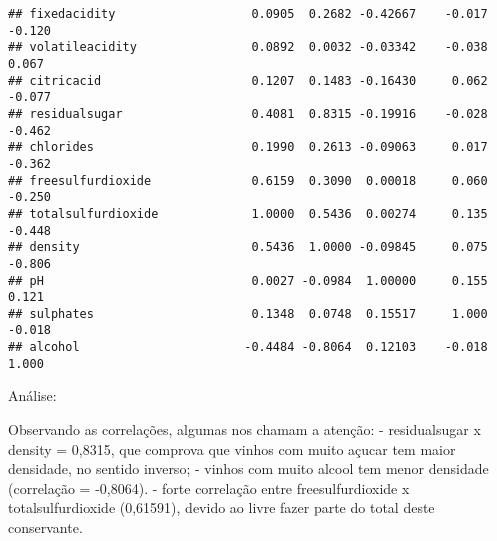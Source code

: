 \documentclass[]{article}
\begin{document}
\begin{verbatim}
## fixedacidity                   0.0905  0.2682 -0.42667    -0.017  -0.120
## volatileacidity                0.0892  0.0032 -0.03342    -0.038   0.067
## citricacid                     0.1207  0.1483 -0.16430     0.062  -0.077
## residualsugar                  0.4081  0.8315 -0.19916    -0.028  -0.462
## chlorides                      0.1990  0.2613 -0.09063     0.017  -0.362
## freesulfurdioxide              0.6159  0.3090  0.00018     0.060  -0.250
## totalsulfurdioxide             1.0000  0.5436  0.00274     0.135  -0.448
## density                        0.5436  1.0000 -0.09845     0.075  -0.806
## pH                             0.0027 -0.0984  1.00000     0.155   0.121
## sulphates                      0.1348  0.0748  0.15517     1.000  -0.018
## alcohol                       -0.4484 -0.8064  0.12103    -0.018   1.000
\end{verbatim}

Análise:

Observando as correlações, algumas nos chamam a atenção: - residualsugar
x density = 0,8315, que comprova que vinhos com muito açucar tem maior
densidade, no sentido inverso; - vinhos com muito alcool tem menor
densidade (correlação = -0,8064). - forte correlação entre
freesulfurdioxide x totalsulfurdioxide (0,61591), devido ao livre fazer
parte do total deste conservante.
\end{document}
